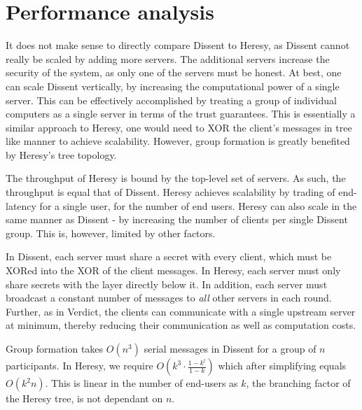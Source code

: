 \section{Performance analysis}
\label{sec:perf-analysis}
It does not make sense to directly compare Dissent to Heresy, as Dissent cannot really be scaled by adding more servers. The additional servers increase the security of the system, as only one of the servers must be honest. At best, one can scale Dissent vertically, by increasing the computational power of a single server. This can be effectively accomplished by treating a group of individual computers as a single server in terms of the trust guarantees. This is essentially a similar approach to Heresy, one would need to XOR the client's messages in tree like manner to achieve scalability. However, group formation is greatly benefited  by Heresy's tree topology.

The throughput of Heresy is bound by the top-level set of servers. As such,
the throughput is equal that of Dissent. Heresy achieves scalability by trading of end-latency for a single user, for the number of end users. Heresy can also scale in the same manner as Dissent - by increasing the number of clients per single Dissent group. This is, however, limited by other factors.

In Dissent, each server must share a secret with every client, which must be XORed into the XOR of the client messages. In Heresy, each server must only share secrets with the layer directly below it. In addition, each server must broadcast a constant number of messages to \emph{all} other servers in each round. Further, as in Verdict, the clients can communicate with a single upstream server at minimum, thereby reducing their communication as well as computation costs.
 
Group formation takes $O(n^3)$ serial messages in Dissent for a group of $n$ participants. In Heresy, we require $O(k^3 \cdot \frac{1-k^l}{1-k})$ which after simplifying equals $O(k^2n)$. This is linear in the number of end-users as $k$, the branching factor of the Heresy tree, is not dependant on $n$.
